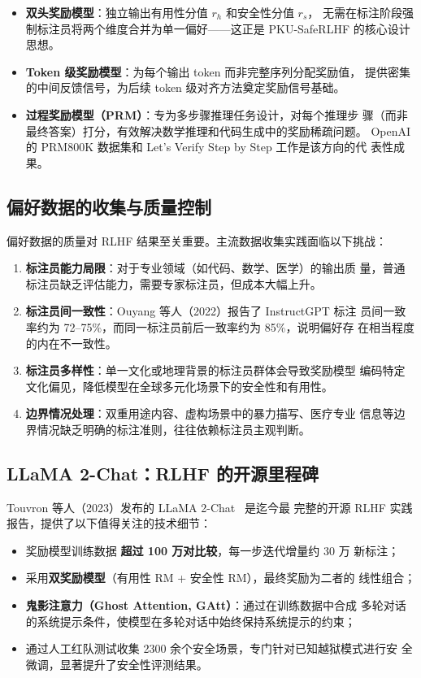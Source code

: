 \documentclass[12pt,a4paper,UTF8]{ctexart}
\begin{document}
\begin{itemize}[leftmargin=2em]
  \item \textbf{双头奖励模型}：独立输出有用性分值 $r_h$ 和安全性分值 $r_s$，
    无需在标注阶段强制标注员将两个维度合并为单一偏好——这正是 PKU-SafeRLHF
    的核心设计思想。
  \item \textbf{Token 级奖励模型}：为每个输出 token 而非完整序列分配奖励值，
    提供密集的中间反馈信号，为后续 token 级对齐方法奠定奖励信号基础。
  \item \textbf{过程奖励模型（PRM）}：专为多步骤推理任务设计，对每个推理步
    骤（而非最终答案）打分，有效解决数学推理和代码生成中的奖励稀疏问题。
    OpenAI 的 PRM800K 数据集和 Let's Verify Step by Step 工作是该方向的代
    表性成果。
\end{itemize}

\subsection{偏好数据的收集与质量控制}

偏好数据的质量对 RLHF 结果至关重要。主流数据收集实践面临以下挑战：

\begin{enumerate}[leftmargin=2em]
  \item \textbf{标注员能力局限}：对于专业领域（如代码、数学、医学）的输出质
    量，普通标注员缺乏评估能力，需要专家标注员，但成本大幅上升。
  \item \textbf{标注员间一致性}：Ouyang 等人（2022）报告了 InstructGPT 标注
    员间一致率约为 72--75\%，而同一标注员前后一致率约为 85\%，说明偏好存
    在相当程度的内在不一致性。
  \item \textbf{标注员多样性}：单一文化或地理背景的标注员群体会导致奖励模型
    编码特定文化偏见，降低模型在全球多元化场景下的安全性和有用性。
  \item \textbf{边界情况处理}：双重用途内容、虚构场景中的暴力描写、医疗专业
    信息等边界情况缺乏明确的标注准则，往往依赖标注员主观判断。
\end{enumerate}

\subsection{LLaMA 2-Chat：RLHF 的开源里程碑}

Touvron 等人（2023）发布的 LLaMA 2-Chat~\cite{touvron2023llama2} 是迄今最
完整的开源 RLHF 实践报告，提供了以下值得关注的技术细节：

\begin{itemize}[leftmargin=2em]
  \item 奖励模型训练数据 \textbf{超过 100 万对比较}，每一步迭代增量约 30 万
    新标注；
  \item 采用\textbf{双奖励模型}（有用性 RM + 安全性 RM），最终奖励为二者的
    线性组合；
  \item \textbf{鬼影注意力（Ghost Attention, GAtt）}：通过在训练数据中合成
    多轮对话的系统提示条件，使模型在多轮对话中始终保持系统提示的约束；
  \item 通过人工红队测试收集 2300 余个安全场景，专门针对已知越狱模式进行安
    全微调，显著提升了安全性评测结果。
\end{itemize}
\end{document}
